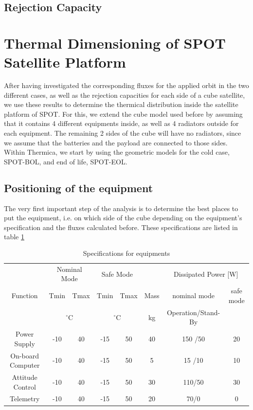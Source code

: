 \subsection{Rejection Capacity}


\section{Thermal Dimensioning of SPOT Satellite Platform}

After having investigated the corresponding fluxes for the applied orbit in the two different cases, as well as the rejection capacities for each side of a cube satellite, we use these results to determine the thermical distribution inside the satellite platform of SPOT. For this, we extend the cube model used before by assuming that it contains 4 different equipments inside, as well as 4 radiators outside for each equipment. The remaining 2 sides of the cube will have no radiators, since we assume that the batteries and the payload are connected to those sides. Within Thermica, we start by using the geometric models for the cold case, SPOT-BOL, and end of life, SPOT-EOL. 

\subsection{Positioning of the equipment}
The very first important step of the analysis is to determine the best places to put the equipment, i.e. on which side of the cube depending on the equipment's specification and the fluxes calculated before. These specifications are listed in table \ref{tab:equipmentspecification}

\begin{table}[h!]
\centering
\begin{tabular}{ | c| c|c|c|c|c|c|c| }
\hline 
&  \multicolumn{2}{|c|}{Nominal Mode} &  \multicolumn{2}{|c|}{Safe Mode} & & \multicolumn{2}{|c|}{Dissipated Power [W] }\\
Function & Tmin & Tmax & Tmin & Tmax & Mass & nominal mode & safe mode  \\
& \multicolumn{2}{|c|}{$^{\circ}$C} & \multicolumn{2}{|c|}{$^{\circ}$C} & kg &Operation/Stand-By &  \\  \hline

Power Supply &-10   & 40  & -15&50  & 40  &  150 /50 & 20  \\ \hline
On-board Computer &-10  & 40 &-15 &50 &5 &15 /10& 10 \\ \hline
Attitude Control &-10  &40 & -15& 50&30 &110/50 &30  \\ \hline
Telemetry &-10  &40 &-15 &50 &20 &70/0 & 0  \\ \hline
\end{tabular}
\caption{Specifications for equipments}
\label{tab:equipmentspecification}
\end{table}


